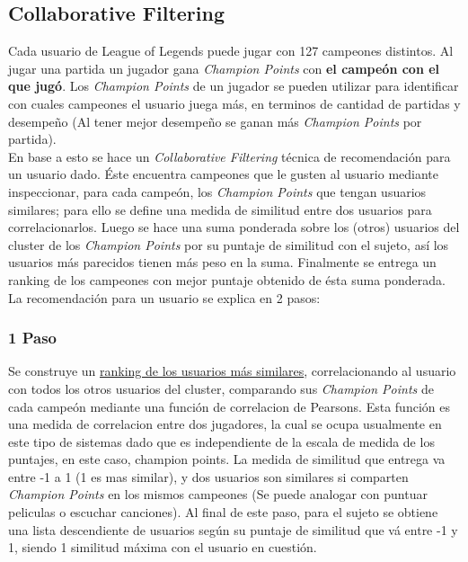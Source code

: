\documentclass[letterpaper,11pt, spanish]{article}
\begin{document}
\subsection{Collaborative Filtering}
Cada usuario de League of Legends puede jugar con 127 campeones distintos. Al jugar una partida un jugador gana \textit{Champion Points} con \textbf{el campeón con el que jugó}.
Los \textit{Champion Points} de un jugador se pueden utilizar para identificar con cuales campeones el usuario juega más, en terminos de cantidad de partidas y desempeño (Al tener mejor desempeño se ganan más \textit{Champion Points} por partida). \\

En base a esto se hace un \textit{Collaborative Filtering} técnica de recomendación para un usuario dado. Éste encuentra campeones que le gusten al usuario mediante inspeccionar, para cada campeón, los \textit{Champion Points} que tengan usuarios similares; para ello se define una medida de similitud entre dos usuarios para correlacionarlos. Luego se hace una suma ponderada sobre los (otros) usuarios del cluster de los \textit{Champion Points} por su puntaje de similitud con el sujeto, así los usuarios más parecidos tienen más peso en la suma. Finalmente se entrega un ranking de los campeones con mejor puntaje obtenido de ésta suma ponderada.\\
La recomendación para un usuario se explica en 2 pasos:

\subsubsection{1 Paso}
Se construye un \underline{ranking de los usuarios más similares}, correlacionando al usuario con todos los otros usuarios del cluster, comparando sus \textit{Champion Points} de cada campeón mediante una función de correlacion de Pearsons. Esta función es una medida de correlacion entre dos jugadores, la cual se ocupa usualmente en este tipo de sistemas dado que es independiente de la escala de medida de los puntajes, en este caso, champion points. La medida de similitud que entrega va entre -1 a 1 (1 es mas similar), y dos usuarios son similares si comparten \textit{Champion Points} en los mismos campeones (Se puede analogar con puntuar peliculas o escuchar canciones). Al final de este paso, para el sujeto se obtiene una lista descendiente de usuarios según su puntaje de similitud que vá entre -1 y 1, siendo 1 similitud máxima con el usuario en cuestión.
\end{document}
